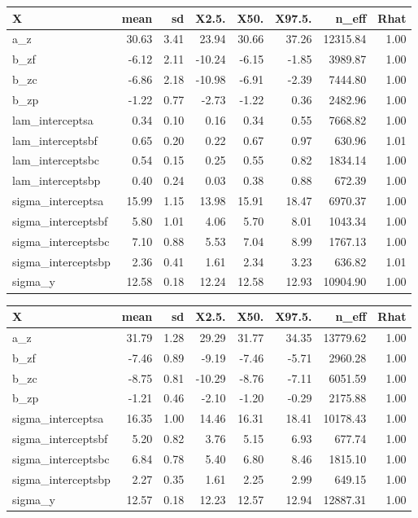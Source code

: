 \documentclass[11pt]{article}
\begin{document}
\begingroup\footnotesize
\begin{tabular}{lrrrrrrr}
  \hline
X & mean & sd & X2.5. & X50. & X97.5. & n\_eff & Rhat \\ 
  \hline
a\_z & 30.63 & 3.41 & 23.94 & 30.66 & 37.26 & 12315.84 & 1.00 \\ 
  b\_zf & -6.12 & 2.11 & -10.24 & -6.15 & -1.85 & 3989.87 & 1.00 \\ 
  b\_zc & -6.86 & 2.18 & -10.98 & -6.91 & -2.39 & 7444.80 & 1.00 \\ 
  b\_zp & -1.22 & 0.77 & -2.73 & -1.22 & 0.36 & 2482.96 & 1.00 \\ 
  lam\_interceptsa & 0.34 & 0.10 & 0.16 & 0.34 & 0.55 & 7668.82 & 1.00 \\ 
  lam\_interceptsbf & 0.65 & 0.20 & 0.22 & 0.67 & 0.97 & 630.96 & 1.01 \\ 
  lam\_interceptsbc & 0.54 & 0.15 & 0.25 & 0.55 & 0.82 & 1834.14 & 1.00 \\ 
  lam\_interceptsbp & 0.40 & 0.24 & 0.03 & 0.38 & 0.88 & 672.39 & 1.00 \\ 
  sigma\_interceptsa & 15.99 & 1.15 & 13.98 & 15.91 & 18.47 & 6970.37 & 1.00 \\ 
  sigma\_interceptsbf & 5.80 & 1.01 & 4.06 & 5.70 & 8.01 & 1043.34 & 1.00 \\ 
  sigma\_interceptsbc & 7.10 & 0.88 & 5.53 & 7.04 & 8.99 & 1767.13 & 1.00 \\ 
  sigma\_interceptsbp & 2.36 & 0.41 & 1.61 & 2.34 & 3.23 & 636.82 & 1.01 \\ 
  sigma\_y & 12.58 & 0.18 & 12.24 & 12.58 & 12.93 & 10904.90 & 1.00 \\ 
  \end{tabular}
\endgroup \clearpage \pagebreak 
\begingroup\footnotesize
\begin{tabular}{lrrrrrrr}
  \hline
X & mean & sd & X2.5. & X50. & X97.5. & n\_eff & Rhat \\ 
  \hline
a\_z & 31.79 & 1.28 & 29.29 & 31.77 & 34.35 & 13779.62 & 1.00 \\ 
  b\_zf & -7.46 & 0.89 & -9.19 & -7.46 & -5.71 & 2960.28 & 1.00 \\ 
  b\_zc & -8.75 & 0.81 & -10.29 & -8.76 & -7.11 & 6051.59 & 1.00 \\ 
  b\_zp & -1.21 & 0.46 & -2.10 & -1.20 & -0.29 & 2175.88 & 1.00 \\ 
  sigma\_interceptsa & 16.35 & 1.00 & 14.46 & 16.31 & 18.41 & 10178.43 & 1.00 \\ 
  sigma\_interceptsbf & 5.20 & 0.82 & 3.76 & 5.15 & 6.93 & 677.74 & 1.00 \\ 
  sigma\_interceptsbc & 6.84 & 0.78 & 5.40 & 6.80 & 8.46 & 1815.10 & 1.00 \\ 
  sigma\_interceptsbp & 2.27 & 0.35 & 1.61 & 2.25 & 2.99 & 649.15 & 1.00 \\ 
  sigma\_y & 12.57 & 0.18 & 12.23 & 12.57 & 12.94 & 12887.31 & 1.00 \\ 
  \end{tabular}
\endgroup \clearpage \pagebreak 
\end{document}
